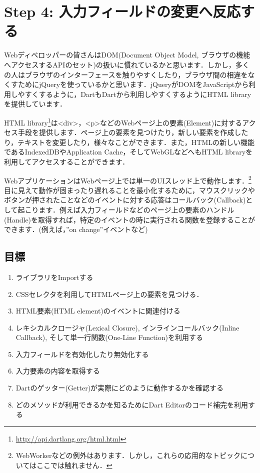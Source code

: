\section{Step 4: 入力フィールドの変更へ反応する}

Webディベロッパーの皆さんはDOM(Document Object Model, ブラウザの機能へアクセスするAPIのセット)の扱いに慣れているかと思います．しかし，多くの人はブラウザのインターフェースを触りやすくしたり，ブラウザ間の相違をなくすためにjQueryを使っているかと思います．jQueryがDOMをJavaScriptから利用しやすくするように，DartもDartから利用しやすくするようにHTML libraryを提供しています．

HTML library\footnote{\url{http://api.dartlang.org/html.html}}は<div>，<p>などのWebページ上の要素(Element)に対するアクセス手段を提供します．ページ上の要素を見つけたり，新しい要素を作成したり，テキストを変更したり，様々なことができます．また，HTMLの新しい機能であるIndexedDBやApplication Cache，そしてWebGLなどへもHTML libraryを利用してアクセスすることができます．

WebアプリケーションはWebページ上では単一のUIスレッド上で動作します．\footnote{WebWorkerなどの例外はあります．しかし，これらの応用的なトピックについてはここでは触れません．}目に見えて動作が固まったり遅れることを最小化するために，マウスクリックやボタンが押されたことなどのイベントに対する応答はコールバック(Callback)として起こります．例えば入力フィールドなどのページ上の要素のハンドル(Handle)を取得すれば，特定のイベントの時に実行される関数を登録することができます．(例えば，''on change''イベントなど)

\subsection{目標}

\begin{enumerate}
\item ライブラリをImportする
\item CSSセレクタを利用してHTMLページ上の要素を見つける．
\item HTML要素(HTML element)のイベントに関連付ける
\item レキシカルクロージャ(Lexical Closure), インラインコールバック(Inline Callback), そして単一行関数(One-Line Function)を利用する
\item 入力フィールドを有効化したり無効化する
\item 入力要素の内容を取得する
\item Dartのゲッター(Getter)が実際にどのように動作するかを確認する
\item どのメソッドが利用できるかを知るためにDart Editorのコード補完を利用する
\end{enumerate}

